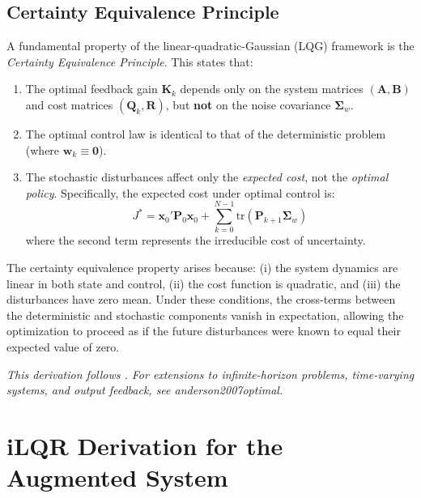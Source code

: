 \documentclass[12pt, a4paper]{article}
\begin{document}
\subsection{Certainty Equivalence Principle}

A fundamental property of the linear-quadratic-Gaussian (LQG) 
framework is the \textit{Certainty Equivalence Principle}. This 
states that:

\begin{enumerate}
    \item The optimal feedback gain $\bm{K}_k$ depends only on the 
    system matrices $(\bm{A}, \bm{B})$ and cost matrices 
    $(\bm{Q}_k, \bm{R})$, but \textbf{not} on the noise covariance 
    $\bm{\Sigma}_w$.
    
    \item The optimal control law is identical to that of the 
    deterministic problem (where $\bm{w}_k \equiv \bm{0}$).
    
    \item The stochastic disturbances affect only the 
    \textit{expected cost}, not the \textit{optimal policy}. 
    Specifically, the expected cost under optimal control is:
    \begin{equation}
        J^* = \bm{x}_0' \bm{P}_0 \bm{x}_0 + 
        \sum_{k=0}^{N-1} \text{tr}(\bm{P}_{k+1} \bm{\Sigma}_w)
        \label{eq:app_expected_cost}
    \end{equation}
    where the second term represents the irreducible cost of 
    uncertainty.
\end{enumerate}

\noindent The certainty equivalence property arises because: (i) the system 
dynamics are linear in both state and control, (ii) the cost 
function is quadratic, and (iii) the disturbances have zero mean. 
Under these conditions, the cross-terms between the deterministic 
and stochastic components vanish in expectation, allowing the 
optimization to proceed as if the future disturbances were known 
to equal their expected value of zero.

\vspace{5mm}

\noindent\textit{This derivation follows \citet[Chapter~3.1]{bertsekas2017dynamic}.
For extensions to infinite-horizon problems, time-varying systems,
and output feedback, see anderson2007optimal.}

\section{iLQR Derivation for the Augmented System}
\label{app:ilqr_derivation}
\end{document}
